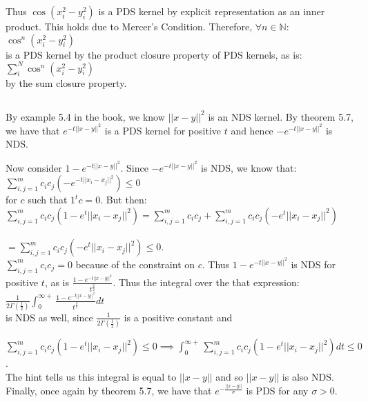 \documentclass[]{article}
\begin{document}
Thus $\cos(x_i^2-y_i^2)$ is a PDS kernel by explicit representation as an inner product. This holds due to Mercer's Condition. Therefore, $\forall n \in \mathbb{N}$:\\

 $\cos^n(x_i^2-y_i^2)$\\
 
 \noindent is a PDS kernel by the product closure property of PDS kernels, as is:\\
 
 $\sum_{i}^{N} \cos^n(x_i^2-y_i^2)$\\
 
 \noindent by the sum closure property.
 
 \subsection{}
 
 By example 5.4 in the book, we know $||x-y||^2$ is an NDS kernel. By theorem 5.7, we have that $e^{-t||x-y||^2}$ is a PDS kernel for positive $t$ and hence $-e^{-t||x-y||^2}$ is NDS.

Now consider $1-e^{-t||x-y||^2}$. Since $-e^{-t||x-y||^2}$ is NDS, we know that:\\

$\sum_{i,j=1}^{m}c_i c_j (-e^{-t||x_i - x_j||^2}) \le 0$\\

\noindent for $c$ such that $1^t c = 0$. But then:\\

$\sum_{i,j=1}^{m}c_i c_j (1-e^t||x_i - x_j||^2) = \sum_{i,j=1}^{m} c_i c_j + \sum_{i,j=1}^{m}c_i c_j (-e^t||x_i - x_j||^2)$\\\\
$= \sum_{i,j=1}^{m}c_i c_j (-e^t||x_i - x_j||^2) \le 0.$\\

\noindent $\sum_{i,j=1}^{m} c_i c_j = 0$ because of the constraint on $c$. Thus $1-e^{-t||x-y||^2}$ is NDS for positive $t$, as is $\frac{1-e^{-t||x-y||^2}}{t^{\frac{3}{2}}}$. Thus the integral over the that expression:\\

$\frac{1}{2 \Gamma(\frac{1}{2})}\int_{0}^{\infty +} \frac{1-e^{-t||x-y||^2}}{t^{\frac{3}{2}}}dt$\\ 

\noindent is NDS as well, since $\frac{1}{2 \Gamma(\frac{1}{2})}$ is a positive constant and

\noindent $\sum_{i,j=1}^{m}c_i c_j (1-e^t||x_i - x_j||^2) \le 0 \implies \int_{0}^{\infty +} \sum_{i,j=1}^{m}c_i c_j (1-e^t||x_i - x_j||^2) dt \le 0$.\\

\noindent The hint tells us this integral is equal to $||x-y||$ and so $||x-y||$ is also NDS. Finally, once again by theorem 5.7, we have that $e^{-\frac{||x-y||}{\sigma}}$ is PDS for any $\sigma > 0$. 
\end{document}
